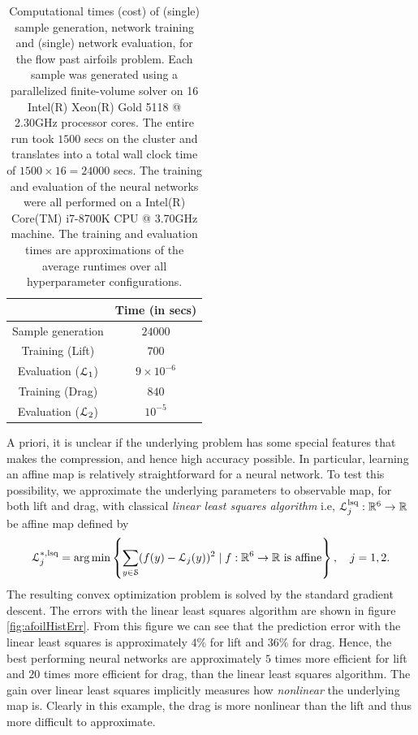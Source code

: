 \documentclass[a4paper]{article}
\numberwithin{equation}{section}
\numberwithin{equation}{section}
\theoremstyle{definition}
\theoremstyle{myremarkstyle}
\newcommand{\R}{\mathbb{R}}
\newcommand{\map}{\EuScript{L}}
\newcommand{\train}{\EuScript{S}}
\begin{document}
\begin{table}[]
\centering
\begin{tabular}{|c|c|}
\hline
\textbf{}           & Time (in secs) \\
\hline
Sample generation & $24000$ \\%
\hline
Training (Lift) & $700$\\%
\hline
Evaluation ($\map_1$) & $9\times 10^{-6}$ \\ %
\hline
Training (Drag) & $840$\\%
\hline
Evaluation ($\map_2$) & $10^{-5}$\\%
\hline
\end{tabular}
\caption{Computational times (cost) of (single) sample generation, network training and (single) network evaluation, for the flow past airfoils problem. Each sample was generated using a parallelized finite-volume solver on 16 Intel(R) Xeon(R) Gold 5118 @ 2.30GHz processor cores. The entire run took $1500$ secs on the cluster and translates into a total wall clock time of $1500 \times 16 = 24000$ secs. The training and evaluation of the neural networks were all performed on a Intel(R) Core(TM) i7-8700K CPU @ 3.70GHz machine. The training and evaluation times are approximations of the average runtimes over all hyperparameter configurations.}
\label{tab:afoilcost}
\end{table}
A priori, it is unclear if the underlying problem has some special features that makes the compression, and hence high accuracy possible. In particular, learning an affine map is relatively straightforward for a neural network. To test this possibility, we approximate the underlying parameters to observable map, for both lift and drag, with classical \emph{linear least squares algorithm} i.e, $\map^{\text{lsq}}_j:\R^{6}\to \R$ be affine map defined by
\begin{equation}
\label{eq:llsq}
\map^{\ast,\text{lsq}}_j=\arg \min \left\{\sum_{y\in\train} (f(y)-\map_j(y))^2\mid f:\R^6\to \R\text{ is affine}\right\},\quad j=1,2.
\end{equation}
The resulting convex optimization problem is solved by the standard gradient descent. The errors with the linear least squares algorithm are shown in figure \ref{fig:afoilHistErr}. From this figure we can see that the prediction error with the linear least squares is approximately $4 \%$ for lift and $36 \%$ for drag. Hence, the best performing neural networks are approximately $5$ times more efficient for lift and $20$ times more efficient for drag, than the linear least squares algorithm. The gain over linear least squares implicitly measures how \emph{nonlinear} the underlying map is. Clearly in this example, the drag is more nonlinear than the lift and thus more difficult to approximate.
\end{document}
